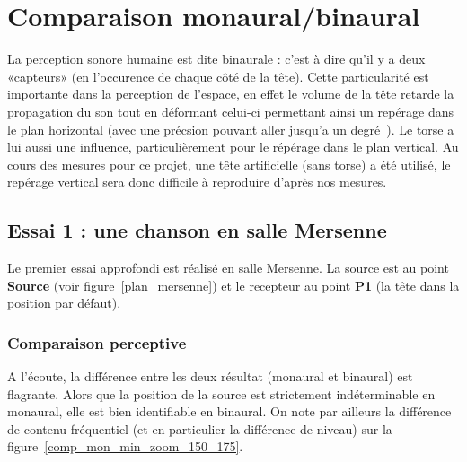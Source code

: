 \chapter{Comparaison monaural/binaural}

La perception sonore humaine est dite binaurale : c'est à dire qu'il y a deux «capteurs» (en l'occurence de chaque côté
de la tête).
Cette particularité est importante dans la perception de l'espace, en effet le volume de la tête retarde la propagation
du son tout en déformant celui-ci permettant ainsi un repérage dans le plan horizontal (avec une précsion pouvant aller
jusqu'a un degré~\cite{Vor08}). Le torse a lui aussi une influence, particulièrement pour le répérage dans le plan
vertical. Au cours des mesures pour ce projet, une tête artificielle (sans torse) a été utilisé, le repérage vertical
sera donc difficile à reproduire d'après nos mesures.

\section{Essai 1 : une chanson en salle Mersenne} %

Le premier essai approfondi est réalisé en salle Mersenne. La source est au point \textbf{Source} (voir
figure~\ref{plan_mersenne}) et le recepteur au point \textbf{P1} (la tête dans la position par défaut).

\subsection{Comparaison perceptive} %

A l'écoute, la différence entre les deux résultat (monaural et binaural) est flagrante. Alors que la position de la
source est strictement indéterminable en monaural, elle est bien identifiable en binaural. On note par ailleurs la
différence de contenu fréquentiel (et en particulier la différence de niveau) sur la
figure~\ref{comp_mon_min_zoom_150_175}.

